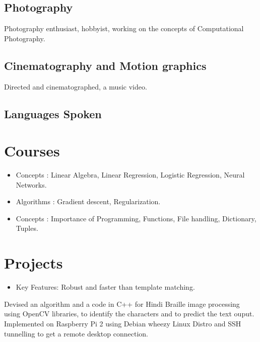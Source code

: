 \documentclass{Resume}
\begin{document}
\subsection{Photography}
{Photography enthusiast, hobbyist, working on the concepts of Computational Photography.}

\subsection{Cinematography and Motion graphics}
{Directed and cinematographed, a music video.}

\subsection{Languages Spoken}

\section{Courses \faCogs}

\begin{itemize}
\item Concepts : Linear Algebra, Linear Regression, Logistic Regression, Neural Networks.
\item Algorithms : Gradient descent, Regularization.
\end{itemize}
\begin{itemize}
\item Concepts : Importance of Programming, Functions, File handling, Dictionary, Tuples. \\
\end{itemize}

\section{Projects \faLightbulb}

\begin{itemize} 
\item Key Features: Robust and faster than template matching.
\end{itemize}
{Devised an algorithm and a code in C++ for Hindi Braille image processing using OpenCV libraries, to identify the characters and to predict the text ouput. Implemented on Raspberry Pi 2 using Debian wheezy Linux Distro and SSH tunnelling to get a remote desktop connection.\\}
\end{document}

